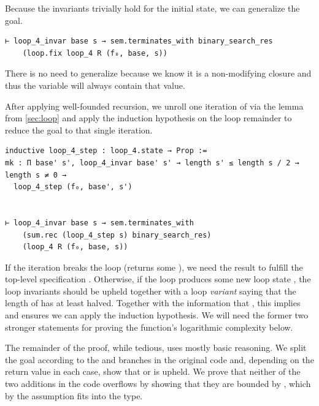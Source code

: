 Because the invariants trivially hold for the initial state, we can generalize
the goal.

\begin{verbatim}
⊢ loop_4_invar base s → sem.terminates_with binary_search_res
    (loop.fix loop_4 R (f₀, base, s))
\end{verbatim}

There is no need to generalize  because we know it is a non-modifying closure
and thus the variable  will always contain that value.

After applying well-founded recursion, we unroll one iteration of
 via the lemma  from \autoref{sec:loop} and
apply the induction hypothesis on the loop remainder to reduce the goal to that
single iteration.

\begin{verbatim}
inductive loop_4_step : loop_4.state → Prop :=
mk : Π base' s', loop_4_invar base' s' → length s' ≤ length s / 2 → length s ≠ 0 →
  loop_4_step (f₀, base', s')


⊢ loop_4_invar base s → sem.terminates_with
    (sum.rec (loop_4_step s) binary_search_res)
    (loop_4 R (f₀, base, s))
\end{verbatim}

If the iteration breaks the loop (returns some ), we need the
result to fulfill the top-level specification .
Otherwise, if the loop produces
some new loop state , the loop invariants should be upheld
together with a loop \emph{variant} saying that the length of  has at
least halved. Together with the information that , this
implies  and ensures we can apply the induction
hypothesis. We will
need the former two stronger statements for proving the function's logarithmic
complexity below.

The remainder of the proof, while tedious, uses mostly basic reasoning. We split
the goal according to the  and  branches in the original
code and, depending on the return value in each case, show that
 or  is upheld. We prove that neither
of the two additions in the code overflows by showing that they are bounded by
, which by the assumption  fits into
the  type.